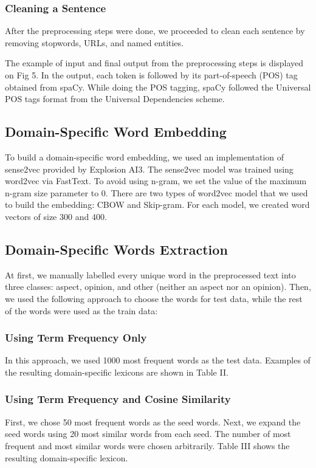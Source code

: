 \documentclass[a4paper,conference]{IEEEtran}
\begin{document}
\subsubsection{Cleaning a Sentence}
After the preprocessing steps were done, we proceeded to clean each sentence by removing stopwords, URLs, and named entities.

The example of input and final output from the preprocessing steps is displayed on Fig 5. In the output, each token is followed by its part-of-speech (POS) tag obtained from spaCy. While doing the POS tagging, spaCy followed the Universal POS tags format from the Universal Dependencies scheme.

\subsection{Domain-Specific Word Embedding}
To build a domain-specific word embedding, we used an implementation of sense2vec provided by Explosion AI3. The sense2vec model was trained using word2vec via FastText. To avoid using n-gram, we set the value of the maximum n-gram size parameter to 0. There are two types of word2vec model that we used to build the embedding: CBOW and Skip-gram. For each model, we created word vectors of size 300 and 400.

\subsection{Domain-Specific Words Extraction}
At first, we manually labelled every unique word in the preprocessed text into three classes: aspect, opinion, and other (neither an aspect nor an opinion). Then, we used the following approach to choose the words for test data, while the rest of the words were used as the train data:

\subsubsection{Using Term Frequency Only}
In this approach, we used 1000 most frequent words as the test data. Examples of the resulting domain-specific lexicons are shown in Table II.

\subsubsection{Using Term Frequency and Cosine Similarity}
First, we chose 50 most frequent words as the seed words. Next, we expand the seed words using 20 most similar words from each seed. The number of most frequent and most similar words were chosen arbitrarily. Table III shows the resulting domain-specific lexicon.
\end{document}
